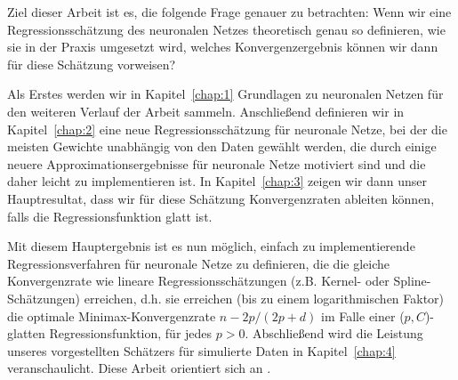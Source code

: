 Ziel dieser Arbeit ist es, die folgende Frage genauer zu betrachten: Wenn wir eine Regressionsschätzung des neuronalen Netzes theoretisch genau so definieren, wie sie in der Praxis umgesetzt wird, welches Konvergenzergebnis können wir dann für diese Schätzung vorweisen? 

Als Erstes werden wir in Kapitel~\ref{chap:1} Grundlagen zu neuronalen Netzen für den weiteren Verlauf der Arbeit sammeln.
Anschließend definieren wir in Kapitel~\ref{chap:2} eine neue Regressionsschätzung für neuronale Netze, bei der die meisten Gewichte unabhängig von den Daten gewählt werden, die durch einige neuere Approximationsergebnisse für neuronale Netze motiviert sind und die daher leicht zu implementieren ist. In Kapitel~\ref{chap:3} zeigen wir dann unser Hauptresultat, dass wir für diese Schätzung Konvergenzraten ableiten können, falls die Regressionsfunktion glatt ist. 

Mit diesem Hauptergebnis ist es nun möglich, einfach zu implementierende Regressionsverfahren für neuronale Netze zu definieren, die die gleiche Konvergenzrate wie lineare Regressionsschätzungen (z.B. Kernel- oder Spline-Schätzungen) erreichen, d.h. sie erreichen (bis zu einem logarithmischen Faktor) die optimale Minimax-Konvergenzrate $n-2p/(2p+d)$ im Falle einer ($p,C$)-glatten Regressionsfunktion, für jedes $p > 0$.
Abschließend wird die Leistung unseres vorgestellten Schätzers für simulierte Daten in Kapitel~\ref{chap:4} veranschaulicht. Diese Arbeit orientiert sich an \cite{kohler19}.
